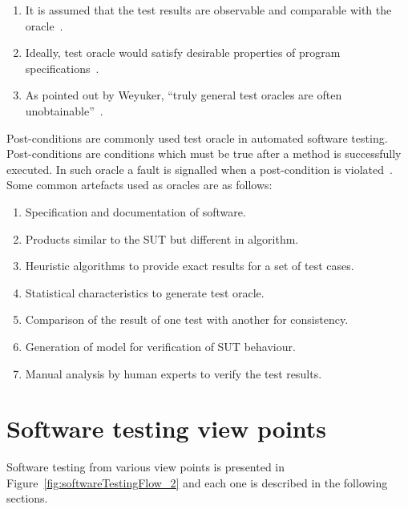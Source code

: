 \begin{enumerate}
\item It is assumed that the test results are observable and comparable with the oracle~\cite{weyuker1982testing}.
\item Ideally, test oracle would satisfy desirable properties of program specifications~\cite{baresi2001test}.
\item As pointed out by Weyuker, ``truly general test oracles are often unobtainable''~\cite{weyuker1982testing}. 
\end{enumerate}
\bigskip
Post-conditions are commonly used test oracle in automated software testing. Post-conditions are conditions which must be true after a method is successfully executed. In such oracle a fault is signalled when a post-condition is violated~\cite{meyer2009programs}. 
Some common artefacts used as oracles are as follows:

\begin{enumerate}
\item Specification and documentation of software.
\item Products similar to the SUT but different in algorithm. %
\item Heuristic algorithms to provide exact results for a set of test cases. %
\item Statistical characteristics to generate test oracle. %
\item Comparison of the result of one test with another for consistency. %
\item Generation of model for verification of SUT behaviour. %
\item Manual analysis by human experts to verify the test results. %
\end{enumerate}

\section{Software testing view points}
Software testing from various view points is presented in Figure~\ref{fig:softwareTestingFlow_2} and each one is described in the following sections.

